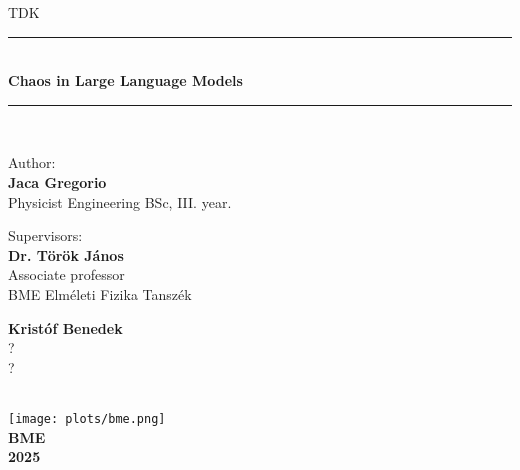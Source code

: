 \documentclass[a4paper,12pt]{article}
\begin{document}
\begin{titlepage}
\newcommand{\HRule}{\rule{\linewidth}{0.5mm}}
\center
\huge\textsc{TDK}
\HRule \\[0.4cm]
{ \huge \bfseries Chaos in Large Language Models}\\[0.2cm] 
\HRule \\[0.5cm]
\begin{minipage}[t]{0.4\textwidth}
\begin{flushleft} \large
Author: \\
\Large\textbf{Jaca Gregorio}\\
\large{Physicist Engineering BSc, III. year.}
\end{flushleft}
\end{minipage}
\qquad
\begin{minipage}[t]{0.4\textwidth}
\begin{flushleft}\large
Supervisors: \\
\Large\textbf{Dr. Török János}\\
\large Associate professor \\
BME Elméleti Fizika Tanszék

\Large\textbf{Kristóf Benedek}\\
\large ? \\
?
\end{flushleft}
\end{minipage}
\\[6cm]
\texttt{[image: plots/bme.png]}\\[0.2cm]
\large{\textbf{BME}}\\
\large{\textbf{2025}}
\vfill
\end{titlepage}


\end{document}
